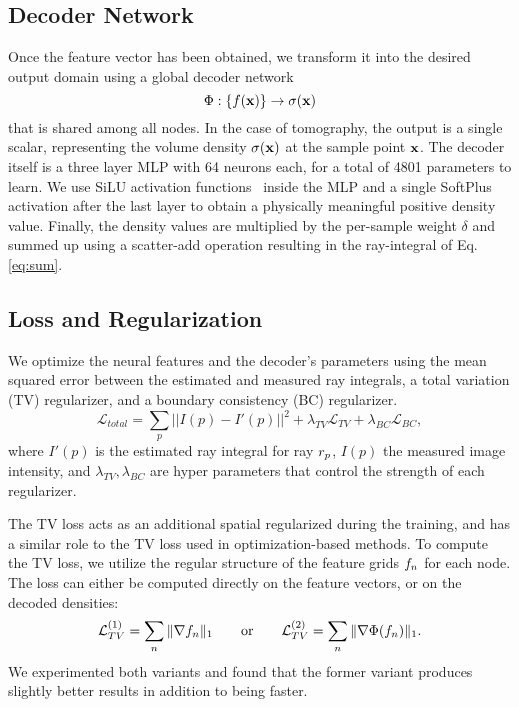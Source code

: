 \documentclass[acmtog,nonacm]{acmart} \acmSubmissionID{0438}
\newcommand{\loss}{\mathcal{L}}
\newcommand{\img}{I}          \newcommand{\bgimg}{\img_0}   \newcommand{\oimg}{\hat\img}  \newcommand{\obgimg}{\hat\img_0}  \newcommand{\pix}{p}
\newcommand{\density}{\sigma} \newcommand{\mlp}{\Phi}
\begin{document}
\subsection{Decoder Network}
\label{sec:decoder}

Once the feature vector has been obtained, we transform it into the desired output domain using a global decoder network
\begin{equation*}
  \mlp: \left\{\feat(\x)\right\} \rightarrow \density(\x)
\end{equation*}
that is shared among all nodes.
In the case of tomography, the output is a single scalar, representing the volume density $\density(\x)$ at the sample point $\mathbf{x}$.
The decoder itself is a three layer MLP with 64 neurons each, for a total of 4801 parameters to learn.
We use SiLU activation functions~\cite{elfwing2018sigmoid} inside the MLP and a single SoftPlus activation after the last layer to obtain a physically meaningful positive density value.
Finally, the density values are multiplied by the per-sample weight $\delta$ and summed up using a scatter-add operation resulting in the ray-integral of Eq. \eqref{eq:sum}.


\subsection{Loss and Regularization}
\label{sec:regularizer}

We optimize the neural features and the decoder's parameters using the mean squared error between the estimated and measured ray integrals, a total variation (TV) regularizer, and a boundary consistency (BC) regularizer.
\begin{equation}
\loss_{total} = \sum_\pix ||\img(\pix) - \img'(\pix) ||^2 + \lambda_{TV}\loss_{TV} + \lambda_{BC}\loss_{BC},
\end{equation}
where $\img'(p)$ is the estimated ray integral for ray $\ray_\pix$, $\img(\pix)$ the measured image intensity, and $\lambda_{TV}, \lambda_{BC}$ are hyper parameters that control the strength of each regularizer.

The TV loss acts as an additional spatial regularized during the
training, and has a similar role to the TV loss used in
optimization-based methods. To compute the TV loss, we utilize the
regular structure of the feature grids $f_n$ for each node. The
loss can either be computed directly on the feature vectors, or on the
decoded densities:
\begin{equation}
  \loss_{TV}^{(1)} = \sum_n\|\nabla\feat_n\|_1\quad\quad\text{or}\quad\quad
  \loss_{TV}^{(2)} = \sum_n\|\nabla\mlp(\feat_n)\|_1.
  \label{eq:tv}
\end{equation}
We experimented both variants and found that the former variant
produces slightly better results in addition to being faster.
\end{document}
